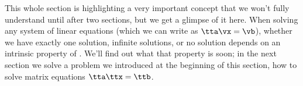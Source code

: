 This whole section is highlighting a very important concept that we won't fully understand until after two sections, but we get a glimpse of it here. When solving any system of linear equations (which we can write as $\tta\vx = \vb$), whether we have exactly one solution, infinite solutions, or no solution depends on an intrinsic property of \tta. We'll find out what that property is soon; in the next section we solve a problem we introduced at the beginning of this section, how to solve matrix equations $\tta\ttx=\ttb$.






